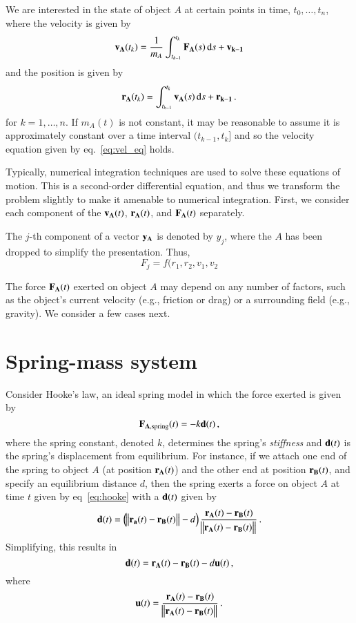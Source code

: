 \documentclass[ ../main.tex]{subfiles}
\begin{document}
We are interested in the state of object $A$ at certain points in time, $t_0,\ldots,t_n$, where the velocity is given by
\begin{equation}
\label{eq:vel_eq}
    \vb{v_A}(t_k) = \frac{1}{m_A} \int_{t_{k-1}}^{t_k} \vb{F_A}(s) \dd{s} + \vb{v_{k-1}}
\end{equation}
and the position is given by
\begin{equation}
    \vb{r_A}(t_k) = \int_{t_{k-1}}^{t_k} \vb{v_A}(s) \dd{s} + \vb{r_{k-1}}\,.
\end{equation}
for $k=1,\ldots,n$. If $m_A(t)$ is not constant, it may be reasonable to assume it is approximately constant over a time interval $(t_{k-1},t_k]$ and so the velocity equation given by eq.~\ref{eq:vel_eq} holds.

Typically, numerical integration techniques are used to solve these equations of motion. This is a second-order differential equation, and thus we transform the problem slightly to make it amenable to numerical integration. First, we consider each component of the $\vb{v_A}(t)$, $\vb{r_A}(t)$, and $\vb{F_A}(t)$ separately.

The $j$-th component of a vector $\vb{y_A}$ is denoted by $y_j$, where the $A$ has been dropped to simplify the presentation. Thus,
\begin{equation}
    F_j = f(r_1,r_2,v_1,v_2
\end{equation}


The force $\vb{F_A}(t)$ exerted on object $A$ may depend on any number of factors, such as the object's current velocity (e.g., friction or drag) or a surrounding field (e.g., gravity). We consider a few cases next.

\section{Spring-mass system}
Consider Hooke's law, an ideal spring model in which the force exerted is given by
\begin{equation}
\label{eq:hooke}
\vb{F_{A,\mathrm{spring}}}(t) = -k \vb{d}(t)\,,
\end{equation}
where the spring constant, denoted $k$, determines the spring's \emph{stiffness} and $\vb{d}(t)$ is the spring's displacement from equilibrium. For instance, if we attach one end of the spring to object $A$ (at position $\vb{r_A}(t)$) and the other end at position $\vb{r_B}(t)$, and specify an equilibrium distance $d$, then the spring exerts a force on object $A$ at time $t$ given by eq~\eqref{eq:hooke} with a $\vb{d}(t)$ given by
\begin{equation}
\vb{d}(t) = \left(\norm{\vb{r_a}(t) - \vb{r_B}(t)} - d\right) \frac{\vb{r_A}(t) - \vb{r_B}(t)}{\norm{\vb{r_A}(t) - \vb{r_B}(t)}}\,.
\end{equation}
Simplifying, this results in
\begin{equation}
\vb{d}(t) = \vb{r_A}(t) - \vb{r_B}(t) - d \vb{u}(t)\,,
\end{equation}
where
\begin{equation}
    \vb{u}(t) = \frac{\vb{r_A}(t) - \vb{r_B}(t)}{\norm{\vb{r_A}(t) - \vb{r_B}(t)}}\,.
\end{equation}
\end{document}
